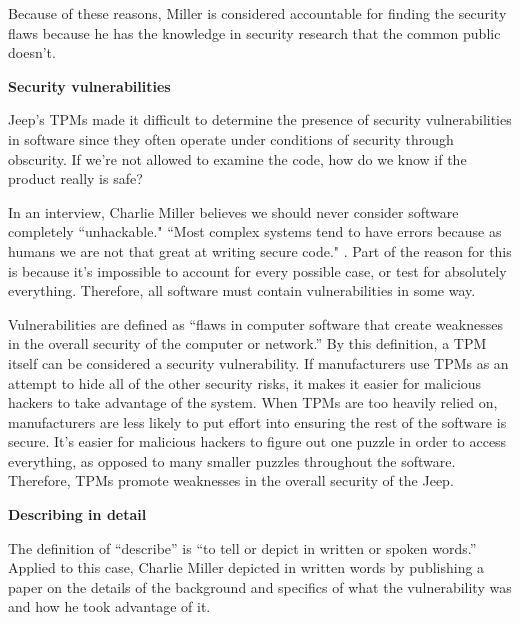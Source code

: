 \documentclass[12pt]{article}
\begin{document}
\begin{multicols}{2}
Because of these reasons, Miller is considered accountable for finding the security flaws because he has the knowledge in security research that the common public doesn't.

\vspace{.5cm}\hspace{-.5cm}\textbf{Security vulnerabilities}\vspace{.2cm}

Jeep's TPMs made it difficult to determine the presence of security vulnerabilities in software since they often operate under conditions of security through obscurity. \cite{chris} If we're not allowed to examine the code, how do we know if the product really is safe?

In an interview, Charlie Miller believes we should never consider software completely ``unhackable."\cite{unhackableInterview}\cite{youtube} ``Most complex systems tend to have errors because as humans we are not that great at writing secure code." \cite{unhackableInterview}. Part of the reason for this is because it's impossible to account for every possible case, or test for absolutely everything. \cite {turner} Therefore, all software must contain vulnerabilities in some way.

Vulnerabilities are defined as ``flaws in computer software that create weaknesses in the overall security of the computer or network.''\cite{norton} By this definition, a TPM itself  can be considered a security vulnerability. If manufacturers use TPMs as an attempt to hide all of the other security risks, it makes it easier for malicious hackers to take advantage of the system. When TPMs are too heavily relied on, manufacturers are  less likely to put effort into ensuring the rest of the software is secure. \cite{turner} 
It's easier for malicious hackers to figure out one puzzle in order to access everything, as opposed to many smaller puzzles throughout the software. Therefore, TPMs promote weaknesses in the overall security of the Jeep.

\vspace{.5cm}\hspace{-.5cm}\textbf{Describing in detail}\vspace{.2cm}

The definition of ``describe'' is ``to tell or depict in written or spoken words.''\cite{dictionary} Applied to this case, Charlie Miller depicted in written words by publishing a paper on the details of the background and specifics of what the vulnerability was and how he took advantage of it. \cite{officialPaper} 


\end{multicols}
\end{document}
